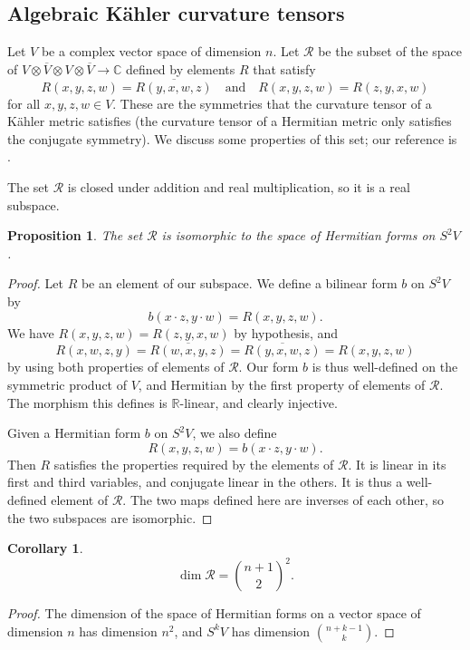 \documentclass[11pt]{article}
\newtheorem{prop}[theo]{Proposition}
\newtheorem{coro}[theo]{Corollary}
\theoremstyle{definition}
\newcommand{\kk}[1]{\mathbb{#1}}
\newcommand{\cc}[1]{\mathcal{#1}}
\begin{document}
\subsection{Algebraic K\"ahler curvature tensors}

Let $V$ be a complex vector space of dimension $n$. Let $\cc R$ be the subset of the space of $V \otimes \overline V \otimes V \otimes \overline V \to \kk C$ defined by elements $R$ that satisfy
$$
R(x, y, z, w) = \overline{R(y, x, w, z)}
\quad\text{and}\quad
R(x, y, z, w) = R(z, y, x, w)
$$
for all $x,y,z,w \in V$. These are the symmetries that the curvature tensor of a K\"ahler metric satisfies (the curvature tensor of a Hermitian metric only satisfies the conjugate symmetry). We discuss some properties of this set; our reference is \cite{algebraic-kahler-curvature}.

The set $\cc R$ is closed under addition and real multiplication, so it is a real subspace.


\begin{prop}
The set $\cc R$ is isomorphic to the space of Hermitian forms on $S^2 V$.
\end{prop}

\begin{proof}
Let $R$ be an element of our subspace. We define a bilinear form $b$ on $S^2 V$ by
$$
b(x \cdot z, y \cdot w)
= R(x, y, z, w).
$$
We have $R(x,y,z,w) = R(z,y,x,w)$ by hypothesis, and
$$
R(x,w,z,y)
= \overline{R(w,x,y,z)}
= \overline{R(y,x,w,z)}
= R(x,y,z,w)
$$
by using both properties of elements of $\cc R$. Our form $b$ is thus well-defined on the symmetric product of $V$, and Hermitian by the first property of elements of $\cc R$. The morphism this defines is $\kk R$-linear, and clearly injective.

Given a Hermitian form $b$ on $S^2V$, we also define
$$
R(x,y,z,w) = b(x \cdot z, y \cdot w).
$$
Then $R$ satisfies the properties required by the elements of $\cc R$. It is linear in its first and third variables, and conjugate linear in the others. It is thus a well-defined element of $\cc R$. The two maps defined here are inverses of each other, so the two subspaces are isomorphic.
\end{proof}


\begin{coro}
$$
\dim \cc R
= \binom{n+1}{2}^2.
$$
\end{coro}


\begin{proof}
The dimension of the space of Hermitian forms on a vector space of dimension $n$ has dimension $n^2$, and $S^k V$ has dimension $\binom{n + k - 1}{k}$.
\end{proof}
\end{document}
